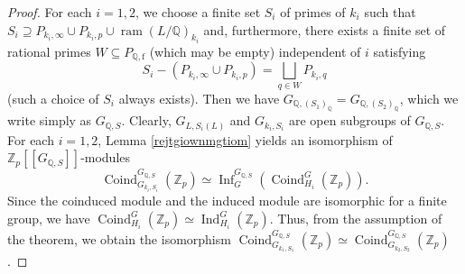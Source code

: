 \documentclass{article}
\numberwithin{equation}{section} %
\begin{document}
\begin{proof}
  For each $i=1,2$, we choose a finite set $S_i$ of primes of $k_i$ such that $S_i \supseteq P_{k_i,\infty} \cup P_{k_i,p} \cup \operatorname{ram}(L/\mathbb{Q})_{k_i}$ and, furthermore, there exists a finite set of rational primes $W \subseteq P_{\mathbb{Q},\mathrm{f}}$ (which may be empty) independent of $i$ satisfying
  \[
    S_i - (P_{k_i,\infty} \cup P_{k_i,p}) = \bigsqcup_{q \in W} P_{k_i,q}
  \]
  (such a choice of $S_i$ always exists). Then we have $G_{\mathbb{Q},(S_1)_{\mathbb{Q}}} = G_{\mathbb{Q},(S_2)_{\mathbb{Q}}}$, which we write simply as $G_{\mathbb{Q},S}$. Clearly, $G_{L,S_i(L)}$ and $G_{k_i,S_i}$ are open subgroups of $G_{\mathbb{Q},S}$. For each $i=1,2$, Lemma \ref{rejtgiownmgtiom} yields an isomorphism of $\mathbb{Z}_p[[G_{\mathbb{Q},S}]]$-modules
  \[
    \operatorname{Coind}_{G_{k_i,S_i}}^{G_{\mathbb{Q},S}} (\mathbb{Z}_p) \simeq \operatorname{Inf}_G^{G_{\mathbb{Q},S}}\left(\operatorname{Coind}_{H_i}^{G} (\mathbb{Z}_p)\right).
  \]
  Since the coinduced module and the induced module are isomorphic for a finite group, we have $\operatorname{Coind}_{H_i}^{G} (\mathbb{Z}_p) \simeq \operatorname{Ind}_{H_i}^G (\mathbb{Z}_p)$. Thus, from the assumption of the theorem, we obtain the isomorphism $\operatorname{Coind}_{G_{k_1,S_1}}^{G_{\mathbb{Q},S}} (\mathbb{Z}_p) \simeq \operatorname{Coind}_{G_{k_2,S_2}}^{G_{\mathbb{Q},S}} (\mathbb{Z}_p)$.
      

\end{proof}
\end{document}
